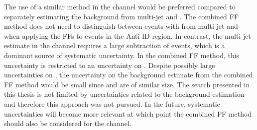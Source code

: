 The use of a similar method in the \hadhad channel would be preferred compared
to separately estimating the \faketauhadvis background from multi-jet and
\ttbar. The combined FF method does not need to distinguish between events with
\faketauhadvis from multi-jet and \ttbar when applying the FFs to events in the
Anti-ID region. In contrast, the multi-jet estimate in the \hadhad channel
requires a large subtraction of \ttbarFakes events, which is a dominant source
of systematic uncertainty. In the combined FF method, this uncertainty is
restricted to an uncertainty on \rqcd. Despite possibly large uncertainties on
\rqcd, the uncertainty on the \faketauhadvis background estimate from the
combined FF method would be small since \FFqcd and \FFttbar are of similar
size. The search presented in this thesis is not limited by uncertainties
related to the \faketauhadvis background estimation and therefore this approach
was not pursued. In the future, systematic uncertainties will become more
relevant at which point the combined FF method should also be considered for the
\hadhad channel.



